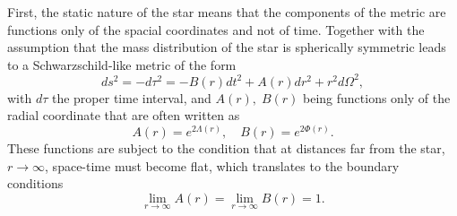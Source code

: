 First, the static nature of the star means that the components of the metric are functions only of the spacial coordinates and not of time. Together with the assumption that the mass distribution of the star is spherically symmetric leads to a Schwarzschild-like metric of the form
\begin{equation}
    ds^2 = -d\tau^2 = -B(r) dt^2 + A(r) dr^2 + r^2 d\Omega^2,
\end{equation}
with $d\tau$ the proper time interval, and $A(r),\;B(r)$ being functions only of the radial coordinate that are often written as 
\begin{equation}
    A(r) = e^{2\Lambda(r)},\quad B(r) = e^{2\Phi(r)}.
\end{equation}
These functions are subject to the condition that at distances far from the star, $r\rightarrow\infty$, space-time must become flat, which translates to the boundary conditions 
\begin{equation}
    \lim_{r\rightarrow \infty} A(r) = \lim_{r\rightarrow \infty} B(r)  = 1.
\end{equation}

